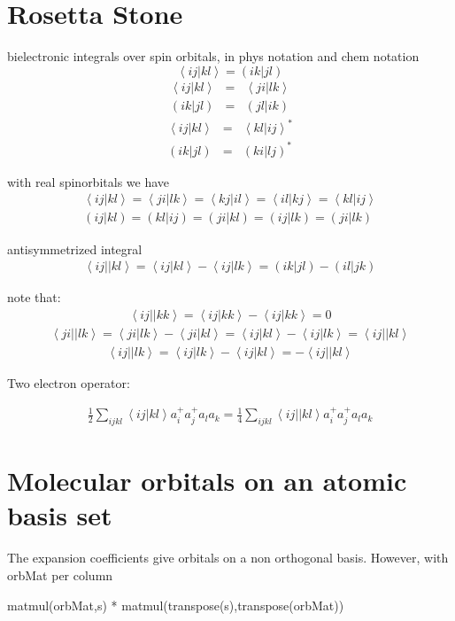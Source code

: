 \documentclass[a4paper,11pt]{report}
\newcommand{\beqa}{\begin{eqnarray*}}
\newcommand{\eeqa}{\end{eqnarray*}}
\begin{document}
\section{Rosetta Stone}

bielectronic integrals over spin orbitals, in phys notation and chem
notation
$$
\left< ij \left|\right. kl \right> = \left( ik \left| \right. jl \right)
$$
\beqa
\left< ij \left|\right. kl \right> &=& \left< ji \left|\right. lk \right>\\
\left( ik \left|\right. jl \right) &=& \left( jl \left|\right. ik \right)
\eeqa
\beqa
\left< ij \left|\right. kl \right> &=&\left< kl \left|\right. ij \right>^{*} \\
\left( ik \left|\right. jl \right) &=& \left( ki \left|\right. lj \right)^{*}
\eeqa

with real spinorbitals we have
\beqa
\left< ij \left|\right. kl \right> = \left< ji \left|\right. lk \right> = \left< kj \left|\right. il \right> = \left< il \left|\right. kj \right> = \left< kl \left|\right. ij \right> \\
\left( ij \left|\right. kl \right) = \left( kl \left|\right. ij \right) = \left( ji \left|\right. kl \right) = \left( ij \left|\right. lk \right) = \left( ji \left|\right. lk \right) 
\eeqa

antisymmetrized integral
\beqa
\left< ij \left|\right| kl \right> =  \left< ij \left|\right. kl \right> - \left< ij \left|\right. lk \right> = \left( ik \left|\right. jl \right) - \left( il \left|\right. jk \right) 
\eeqa

note that:
\beqa
\left< ij \left|\right| kk \right> =  \left< ij \left|\right. kk \right> - \left< ij \left|\right. kk \right> = 0
\eeqa
\beqa
\left< ji \left|\right| lk \right>=\left< ji \left|\right. lk \right> - \left< ji \left|\right. kl \right>   =\left< ij \left|\right. kl \right> - \left< ij \left|\right. lk \right>   =\left< ij \left|\right| kl \right>
\eeqa
\beqa
\left< ij \left|\right| lk \right>= \left< ij \left|\right. lk \right> - \left< ij \left|\right. kl \right> = - \left< ij \left|\right| kl \right>
\eeqa


Two electron operator:

\beqa
\frac{1}{2}\sum_{ijkl} \left<ij\left|\right.kl\right> a^+_i a^+_j  a_l a_k =
\frac{1}{4}\sum_{ijkl} \left<ij\left|\right|kl\right> a^+_i a^+_j  a_l a_k
\eeqa

\section{Molecular orbitals on an atomic basis set}

The expansion coefficients give orbitals on a non orthogonal basis.
However, with orbMat per column


matmul(orbMat,s) * matmul(transpose(s),transpose(orbMat))
\end{document}
